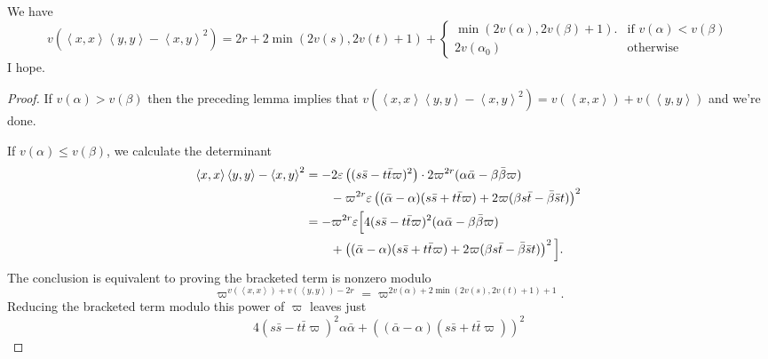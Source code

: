 \begin{lemma}
  We have
  \[ v( \left\langle x,x \right\rangle \left\langle y,y \right\rangle - \left\langle x,y \right\rangle^2)
    =
    2r + 2\min\left( 2v(s), 2v(t) +1 \right)
    +
    \begin{cases}
      \min\left( 2v(\alpha), 2v(\beta) + 1 \right).
      & \text{if } v(\alpha) < v(\beta) \\
      2v\left( \alpha_0 \right) & \text{otherwise}
    \end{cases}
  \]
  I hope.
\end{lemma}
\begin{proof}
  If $v(\alpha) > v(\beta)$
  then the preceding lemma implies that
  $ v( \left\langle x,x \right\rangle \left\langle y,y \right\rangle - \left\langle x,y \right\rangle^2)
  = v\left( \left\langle x,x \right\rangle \right) + v\left( \left\langle y,y \right\rangle \right)$
  and we're done.

  If $v(\alpha) \le v(\beta)$, we calculate the determinant
  \begin{align*}
    \left\langle x,x \right\rangle \left\langle y,y \right\rangle
    - \left\langle x,y \right\rangle^2
    &= -2\varepsilon\left( (s \bar s - t \bar t \varpi)^2 \right)
      \cdot 2\varpi^{2r} (\alpha \bar\alpha - \beta\bar\beta \varpi) \\
    &\qquad- \varpi^{2r} \varepsilon \left(
      (\bar\alpha - \alpha)(s \bar s + t \bar t \varpi)
      + 2\varpi(\beta s \bar t - \bar\beta \bar s t) \right)^2 \\
    &= -\varpi^{2r}\varepsilon \Big[
      4 (s \bar s - t \bar t \varpi)^2 (\alpha \bar \alpha - \beta \bar\beta \varpi) \\
      &\qquad+ \left( (\bar\alpha - \alpha)(s \bar s + t \bar t \varpi)
      + 2\varpi(\beta s \bar t - \bar\beta \bar s t) \right)^2 \Big].
  \end{align*}
  The conclusion is equivalent to proving the bracketed term is nonzero modulo
  \[ \varpi^{v(\left\langle x,x \right\rangle) + v(\left\langle y,y \right\rangle) - 2r}
    = \varpi^{2v(\alpha)+2\min(2v(s), 2v(t)+1)+1}. \]
  Reducing the bracketed term modulo this power of $\varpi$ leaves just
  \[ 4 (s \bar s - t \bar t \varpi)^2 \alpha \bar \alpha
      + \left( (\bar\alpha - \alpha)(s \bar s + t \bar t \varpi) \right)^2 \]
\end{proof}
